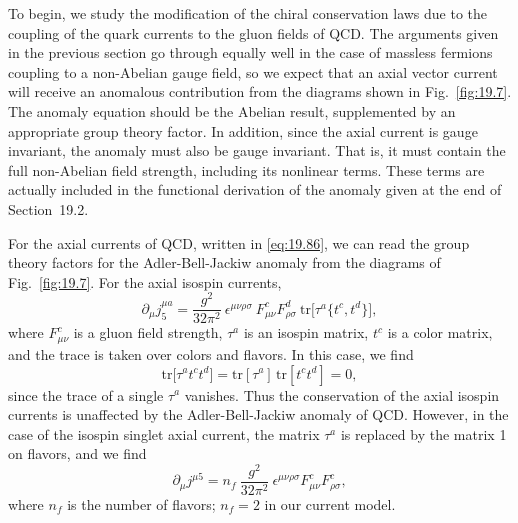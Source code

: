 To begin, we study the modification of the chiral conservation laws due to
the coupling of the quark currents to the gluon fields of QCD.  The arguments
given in the previous section go through equally well in the case of massless
fermions coupling to a non-Abelian gauge field, so we expect that an axial
vector current will receive an anomalous contribution from the diagrams shown
in Fig.~\ref{fig:19.7}.  The anomaly equation should be the Abelian result,
supplemented by an appropriate group theory factor.  In addition, since the
axial current is gauge invariant, the anomaly must also be gauge invariant.
That is, it must contain the full non-Abelian field strength, including its
nonlinear terms.  These terms are actually included in the functional
derivation of the anomaly given at the end of Section~19.2.

For the axial currents of QCD, written in \eqref{eq:19.86}, we can read the
group theory factors for the Adler-Bell-Jackiw anomaly from the diagrams of
Fig.~\ref{fig:19.7}.  For the axial isospin currents,
\begin{equation}
  \partial_\mu j^{\mu a}_5 = \frac{g^2}{32\pi^2}\ \epsilon^{\mu\nu\rho\sigma}\
    F^c_{\mu\nu}F^d_{\rho\sigma}\ \mathrm{tr}\bigl[ \tau^a\{t^c, t^d\} \bigr],
  \label{eq:19.103}
\end{equation}
where $F^c_{\mu\nu}$ is a gluon field strength, $\tau^a$ is an isospin
matrix, $t^c$ is a color matrix, and the trace is taken over colors and
flavors.  In this case, we find
\begin{equation}
  \mathrm{tr}\bigl[ \tau^a t^c t^d \bigr] = \mathrm{tr}[\tau^a]\,
    \mathrm{tr}[t^c t^d] = 0 ,
  \label{eq:19.104}
\end{equation}
since the trace of a single $\tau^a$ vanishes.  Thus the conservation of the
axial isospin currents is unaffected by the Adler-Bell-Jackiw anomaly of QCD.
However, in the case of the isospin singlet axial current, the matrix $\tau^a$
is replaced by the matrix 1 on flavors, and we find
\begin{equation}
  \partial_\mu j^{\mu 5} = n_f\ \frac{g^2}{32\pi^2}\ \epsilon^{\mu\nu\rho\sigma}
    F^c_{\mu\nu}F^c_{\rho\sigma} ,
  \label{eq:19.105}
\end{equation}
where $n_f$ is the number of flavors; $n_f = 2$ in our current model.

